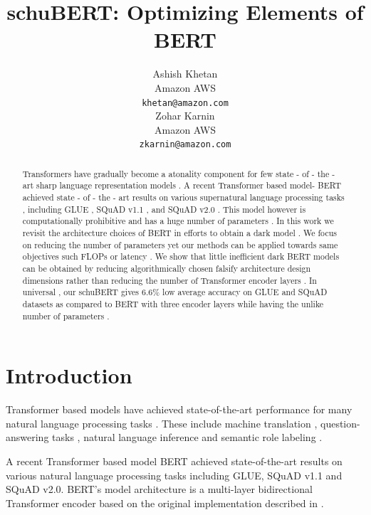 \documentclass[11pt,a4paper]{article}
\title{schuBERT: Optimizing Elements of BERT}
\author{Ashish Khetan \\
  Amazon AWS \\
  \texttt{khetan@amazon.com} \\\And
  Zohar Karnin \\
 Amazon AWS \\
  \texttt{zkarnin@amazon.com} \\}
\date{}
\begin{document}
\maketitle
\begin{abstract}
Transformers \citep{vaswani2017attention } have gradually become a atonality component for few state - of - the - art sharp language representation models . A recent Transformer based model- BERT \citep{devlin2018bert } achieved state - of - the - art results on various supernatural language processing tasks , including GLUE , SQuAD v1.1 , and SQuAD v2.0 . This model however is computationally prohibitive and has a huge number of parameters . In this work we revisit the architecture choices of BERT in efforts to obtain a dark model . We focus on reducing the number of parameters yet our methods can be applied towards same objectives such FLOPs or latency . We show that little inefficient dark BERT models can be obtained by reducing algorithmically chosen falsify architecture design dimensions rather than reducing the number of Transformer encoder layers . In universal , our schuBERT gives 6.6\% low average accuracy on GLUE and SQuAD datasets as compared to BERT with three encoder layers while having the unlike number of parameters . \end{abstract}

\section{Introduction}
Transformer \citep{vaswani2017attention} based models have achieved state-of-the-art performance for many natural language processing tasks \citep{dai2015semi, peters2018deep, radford2018improving, howard2018universal}. These include machine translation \citep{vaswani2017attention, ott2018scaling}, question-answering tasks \citep{devlin2018bert}, natural language inference \citep{bowman2015large, williams2017broad} and semantic role labeling \citep{strubell2018linguistically}. 

A recent Transformer based model BERT \citep{devlin2018bert} achieved state-of-the-art results on various natural language processing tasks including GLUE, SQuAD v1.1 and SQuAD v2.0. BERT's model architecture is a multi-layer bidirectional Transformer 
encoder based on the original implementation described in \citet{vaswani2017attention}. 
\end{document}
